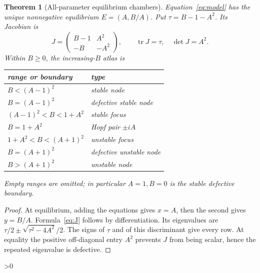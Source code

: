 \documentclass[10pt]{article}
\providecommand{\CRevisionRound}{2}
\newtheorem{theorem}{Theorem}
\newcommand{\tr}{\operatorname{tr}}
\begin{document}
\begin{theorem}[All-parameter equilibrium chambers]\label{thm:linear}
Equation~\eqref{eq:model} has the unique nonnegative equilibrium
$E=(A,B/A)$.  Put $\tau=B-1-A^2$.  Its Jacobian is
\begin{equation}\label{eq:J}
 J=\begin{pmatrix}B-1&A^2\\-B&-A^2\end{pmatrix},
 \qquad \tr J=\tau,\quad\det J=A^2.
\end{equation}
Within $B\ge0$, the increasing-$B$ atlas is
\begin{center}\small
\begin{tabular}{@{}ll@{}}\toprule
range or boundary & type \\ \midrule
$B<(A-1)^2$ & stable node \\
$B=(A-1)^2$ & defective stable node \\
$(A-1)^2<B<1+A^2$ & stable focus \\
$B=1+A^2$ & Hopf pair $\pm iA$ \\
$1+A^2<B<(A+1)^2$ & unstable focus \\
$B=(A+1)^2$ & defective unstable node \\
$B>(A+1)^2$ & unstable node \\ \bottomrule
\end{tabular}
\end{center}
Empty ranges are omitted; in particular $A=1,B=0$ is the stable defective
boundary.
\end{theorem}
\begin{proof}
At equilibrium, adding the equations gives $x=A$, then the second gives
$y=B/A$.  Formula~\eqref{eq:J} follows by differentiation.  Its eigenvalues
are $\tau/2\pm\sqrt{\tau^2-4A^2}/2$.  The signs of $\tau$ and of this
discriminant give every row.  At equality the positive off-diagonal entry
$A^2$ prevents $J$ from being scalar, hence the repeated eigenvalue is
defective.
\end{proof}

\ifnum\CRevisionRound>0
\end{document}
